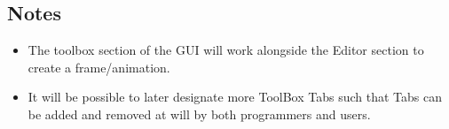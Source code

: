 \documentclass{article}
\begin{document}
	\subsection{Notes}
	\begin{itemize}
		\item The toolbox section of the GUI will work alongside the Editor section to create a frame/animation. 

		\item It will be possible to later designate more ToolBox Tabs such that Tabs can be added and removed at will by both programmers and users.
	\end{itemize}
	
\end{document}
